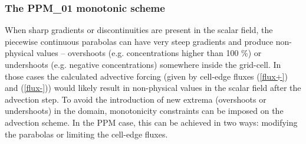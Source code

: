   \subsubsection{The PPM\_01 monotonic scheme}  

  When sharp gradients or discontinuities are present in the scalar
  field, the piecewise continuous parabolas can have very steep
  gradients and produce non-physical values -- overshoots
  (e.g. concentrations higher than 100 \%) or undershoots (e.g. negative
  concentrations) somewhere inside the grid-cell. In those cases the
  calculated advective forcing (given by cell-edge fluxes (\ref{flux+})
  and (\ref{flux-})) would likely result in non-physical values in the
  scalar field after the advection step. To avoid the introduction of
  new extrema (overshoots or undershoots) in the domain, monotonicity
  constraints can be imposed on the advection scheme. In the PPM case,
  this can be achieved in two ways: modifying the parabolas or limiting
  the cell-edge fluxes.

